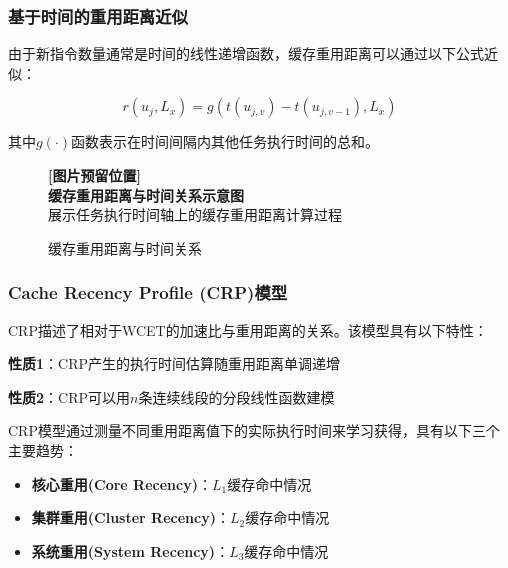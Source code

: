 \subsubsection{基于时间的重用距离近似}

由于新指令数量通常是时间的线性递增函数，缓存重用距离可以通过以下公式近似：

\begin{tcolorbox}[
    colback=green!5!white,
    colframe=green!50!black,
    arc=3pt,
    center
]
$$r(u_j, L_x) = g(t(u_{j,v}) - t(u_{j,v-1}), L_x)$$
\end{tcolorbox}

其中$g(\cdot)$函数表示在时间间隔内其他任务执行时间的总和。

\begin{figure}[htbp]
\centering
\begin{tcolorbox}[
    colback=gray!10,
    colframe=gray!50,
    width=0.85\textwidth,
    center,
    arc=3pt
]
\centering
\textbf{[图片预留位置]}\\
\textbf{缓存重用距离与时间关系示意图}\\
\footnotesize{展示任务执行时间轴上的缓存重用距离计算过程}
\end{tcolorbox}
\caption{缓存重用距离与时间关系}
\label{fig:cache_recency_timeline}
\end{figure}

\subsubsection{Cache Recency Profile (CRP)模型}

CRP描述了相对于WCET的加速比与重用距离的关系。该模型具有以下特性：

\begin{tcolorbox}[
    colback=orange!10!white,
    colframe=orange!50!black,
    title=\textbf{CRP模型核心性质},
    fonttitle=\bfseries,
    arc=3pt
]
\textbf{性质1}：CRP产生的执行时间估算随重用距离单调递增

\textbf{性质2}：CRP可以用$n$条连续线段的分段线性函数建模
\end{tcolorbox}

CRP模型通过测量不同重用距离值下的实际执行时间来学习获得，具有以下三个主要趋势：

\begin{tcolorbox}[
    colback=cyan!5!white,
    colframe=cyan!50!black,
    arc=3pt,
    left=5pt,
    right=5pt
]
\begin{itemize}    \item \textbf{核心重用(Core Recency)}：$L_1$缓存命中情况
    \item \textbf{集群重用(Cluster Recency)}：$L_2$缓存命中情况  
    \item \textbf{系统重用(System Recency)}：$L_3$缓存命中情况
\end{itemize}
\end{tcolorbox}

